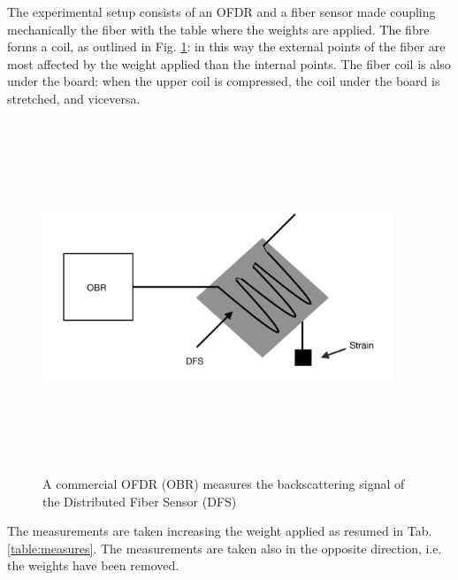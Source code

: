The experimental setup consists of an OFDR and a fiber sensor made coupling mechanically the fiber with the table where the weights are applied. The fibre forms a coil, as outlined in Fig. \ref{fig:setup}: in this way the external points of the fiber are most affected by the weight applied than the internal points. The fiber coil is also under the board: when the upper coil is compressed, the coil under the board is stretched, and viceversa.
\begin{figure}[H]
	\centering
	\includegraphics[height=10.5cm, width=10.5cm, keepaspectratio]{img/setup.png}
	\caption{A commercial OFDR (OBR) measures the backscattering signal of the Distributed Fiber Sensor (DFS)}\label{fig:setup}
\end{figure}
The measurements are taken increasing the weight applied as resumed in Tab.\ref{table:measures}. The measurements are taken also in the opposite direction, i.e. the weights have been removed.
